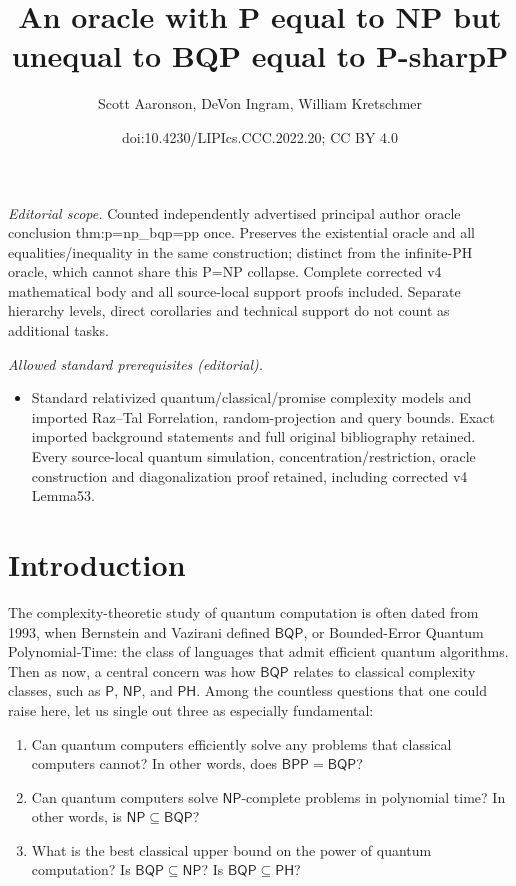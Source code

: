 \documentclass[10pt,a4paper]{article}
\title{An oracle with P equal to NP but unequal to BQP equal to P-sharpP}
\author{Scott Aaronson, DeVon Ingram, William Kretschmer}
\date{doi:10.4230/LIPIcs.CCC.2022.20; CC BY 4.0}
\begin{document}
\maketitle
\noindent\textit{Editorial scope.} Counted independently advertised principal author oracle conclusion thm:p=np\_bqp=pp once. Preserves the existential oracle and all equalities/inequality in the same construction; distinct from the infinite-PH oracle, which cannot share this P=NP collapse. Complete corrected v4 mathematical body and all source-local support proofs included. Separate hierarchy levels, direct corollaries and technical support do not count as additional tasks.\par\medskip
\noindent\textit{Allowed standard prerequisites (editorial).}\begin{itemize}
\item Standard relativized quantum/classical/promise complexity models and imported Raz–Tal Forrelation, random-projection and query bounds. Exact imported background statements and full original bibliography retained. Every source-local quantum simulation, concentration/restriction, oracle construction and diagonalization proof retained, including corrected v4 Lemma53.
\end{itemize}\medskip
\section{Introduction\label{INTRO}}

The complexity-theoretic study of quantum computation is often dated from 1993, when Bernstein and Vazirani \cite{BV97} defined $\mathsf{BQP}$, or Bounded-Error Quantum Polynomial-Time: the class of languages that admit efficient quantum algorithms.  Then as now, a central concern was how $\mathsf{BQP}$ relates to classical complexity classes, such as $\mathsf{P}$, $\mathsf{NP}$, and $\mathsf{PH}$.  Among the countless questions that one could raise here, let us single out three as especially fundamental:
\begin{enumerate}[(1)]
\item Can quantum computers efficiently solve any problems that classical computers cannot?  In other words, does $\mathsf{BPP}= \mathsf{BQP}$?
\item Can quantum computers solve $\mathsf{NP}$-complete problems in polynomial time?  In other words, is $\mathsf{NP} \subseteq \mathsf{BQP}$?
\item What is the best classical upper bound on the power of quantum computation?  Is $\mathsf{BQP} \subseteq \mathsf{NP}$?  Is $\mathsf{BQP} \subseteq \mathsf{PH}$?
\end{enumerate}
\end{document}
